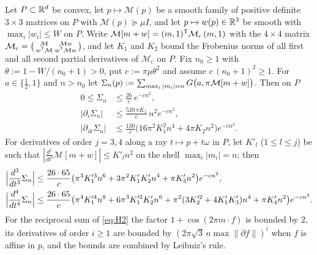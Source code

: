 \begin{lemma}\label{lem:tails}
Let $P\subset\mathbb R^d$ be convex, let $p\mapsto\mathcal M(p)$ be a smooth family of positive definite $3\times3$ matrices on $P$ with
$\mathcal M(p)\succeq\mu I$, and let $p\mapsto w(p)\in\mathbb R^3$ be smooth with $\max_i|w_i|\le W$ on $P$. Write
$\mathcal M[m+w]=(m,1)^\mathsf T\mathcal M_{\mathrm c}\,(m,1)$ with the $4\times4$ matrix
$\mathcal M_{\mathrm c}=\bigl(\begin{smallmatrix}\mathcal M&\mathcal Mw\\ w^\mathsf T\mathcal M&w^\mathsf T\mathcal Mw\end{smallmatrix}\bigr)$, and let
$K_1$ and $K_2$ bound the Frobenius norms of all first and all second partial derivatives of $\mathcal M_{\mathrm c}$ on $P$. Fix
$n_0\ge1$ with $\theta:=1-W/(n_0+1)>0$, put $c:=\pi\mu\theta^2$ and assume $c\,(n_0+1)^2\ge1$. For $a\in\{\frac12,1\}$ and $n>n_0$ let
$\Sigma_n(p):=\sum_{\max_i|m_i|=n}G\bigl(a,\pi\mathcal M[m+w]\bigr)$. Then on $P$
\begin{align*}
  0\le\Sigma_n&\le\frac{26}c\,e^{-cn^2},\\
  |\partial_i\Sigma_n|&\le\frac{520\,\pi K_1}{c}\,n^2e^{-cn^2},\\
  |\partial_{ik}\Sigma_n|&\le\frac{130}c\bigl(16\pi^2K_1^2n^4+4\pi K_2n^2\bigr)e^{-cn^2}.
\end{align*}
For derivatives of order $j=3,4$ along a ray $t\mapsto p+t\omega$ in $P$, let $K'_l$ ($1\le l\le j$) be such that
$|\frac{d^l}{dt^l}\mathcal M[m+w]|\le K'_ln^2$ on the shell $\max_i|m_i|=n$; then
\begin{align*}
  \Bigl|\frac{d^3}{dt^3}\Sigma_n\Bigr|&\le\frac{26\cdot65}{c}\bigl(\pi^3K_1'^3n^6+3\pi^2K'_1K'_2n^4+\pi K'_3n^2\bigr)e^{-cn^2},\\
  \Bigl|\frac{d^4}{dt^4}\Sigma_n\Bigr|&\le\frac{26\cdot65}{c}\bigl(\pi^4K_1'^4n^8+6\pi^3K_1'^2K'_2n^6+\pi^2(3K_2'^2+4K'_1K'_3)n^4+\pi K'_4n^2\bigr)e^{-cn^2}.
\end{align*}
For the reciprocal sum of \eqref{eq:H2} the factor $1+\cos(2\pi m\cdot f)$ is bounded by $2$, its derivatives of order $i\ge1$ are
bounded by $(2\pi\sqrt3\,n\max\|\partial f\|)^i$ when $f$ is affine in $p$, and the bounds are combined by Leibniz's rule.
\end{lemma}

